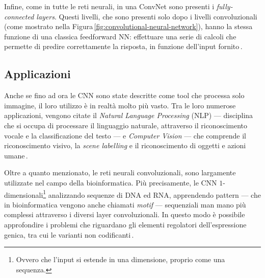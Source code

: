 Infine, come in tutte le reti neurali, in una \acs{ConvNet} sono presenti i \textit{fully-connected layers}. Questi livelli, che sono presenti solo dopo i livelli convoluzionali (come mostrato nella Figura\,\ref{fig:convolutional-neural-network}), hanno la stessa funzione di una classica feedforward \acs{NN}: effettuare una serie di calcoli che permette di predire correttamente la risposta, in funzione dell'input fornito\,\cite{aggarwal2018neural, o2015introduction}.

\subsection{Applicazioni}

Anche se fino ad ora le \acs{CNN} sono state descritte come tool che processa solo immagine, il loro utilizzo è in realtà molto più vasto. Tra le loro numerose applicazioni, vengono citate il \textit{Natural Language Processing} (\acs{NLP}) — disciplina che si occupa di processare il linguaggio naturale, attraverso il riconoscimento vocale e la classificazione del testo — e \textit{Computer Vision} — che comprende il riconoscimento visivo, la \textit{scene labelling} e il riconoscimento di oggetti e azioni umane\,\cite{shamsaldin2019study, li2021survey, bhatt2021cnn}.

Oltre a quanto menzionato, le reti neurali convoluzionali, sono largamente utilizzate nel campo della bioinformatica. Più precisamente, le \acs{CNN} $1$-dimensionali\footnote{Ovvero che l'input si estende in una dimensione, proprio come una sequenza.} analizzando sequenze di \acs{DNA} ed \acs{RNA}, apprendendo pattern — che in bioinformatica vengono anche chiamati \textit{motif} — sequenziali man mano più complessi attraverso i diversi layer convoluzionali. In questo modo è possibile approfondire i problemi che riguardano gli elementi regolatori dell'espressione genica, tra cui le varianti non codificanti\,\cite{min2017deep}.






\begin{comment}
    Per non diventare matti la notazione è l'opposta di quella sul file di Machine Learnign.
    - ci sono esattamente N feature in un vettore di input, di conseguenza il vettore di pesi è di lunghezza N
    - ci sono esattamente M vettori di input nel dataset, di conseguenza la lunghezza della label è M
    - Il dataset D è composta da j colonne ed i righe
    - Ciascuna riga j rappresenta un elemento del dataset
    - Ciascuna colonna i rappresente un feature del dataset
    
    Di conseguneza D_j indica il vettore j-esimo composto esattamente da N componenti. La label y_j indica il vero valore dell'input processato
\end{comment}

